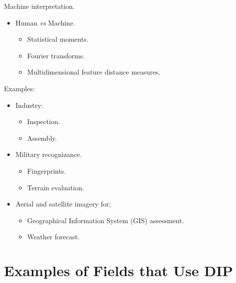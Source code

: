 
\begin{frame}
Machine interpretation.
\begin{itemize}
\item Human \textit{vs} Machine.
\begin{itemize}
\item Statistical moments.
\item Fourier transforms.
\item Multidimensional feature distance measures.
\end{itemize}
\end{itemize}
\end{frame}


\begin{frame}
Examples:
	\begin{itemize}
		\item Industry:
			\begin{itemize}
			\item Inspection.
			\item Assembly.
			\end{itemize}
		\item Military recognizance.
			\begin{itemize}
			\item Fingerprints.
			\item Terrain evaluation.
			\end{itemize}
		\item Aerial and satellite imagery for;
			\begin{itemize}
			\item Geographical Information System (GIS) assessment.
			\item Weather forecast.
			\end{itemize}
	\end{itemize}
\end{frame}


\section{Examples of Fields that Use DIP}

